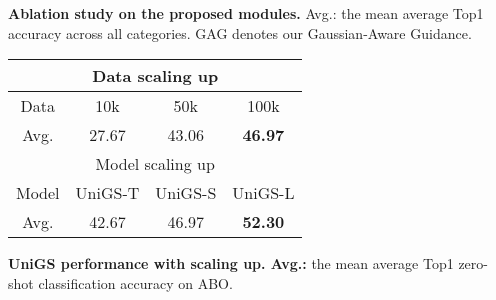 \begin{minipage}{\textwidth}
\begin{minipage}[t]{0.57\textwidth}
\begin{tabularx}{1\textwidth}{ c | c c c c c | c }
\bottomrule
\end{tabularx}
		\caption{\textbf{Ablation study on the proposed modules.} Avg.: the mean average Top1 accuracy across all categories. GAG denotes our Gaussian-Aware Guidance.}
  \label{tab:ablation-study-structure}
\end{minipage}
    \hspace{8pt}
\begin{minipage}[t]{0.37\textwidth}
\makeatletter{}
 \addtolength{\tabcolsep}{-3pt}
 \footnotesize
 \begin{tabularx}{1\textwidth}{ c | c c c}
\toprule
\multicolumn{4}{c}{Data scaling up} \tabularnewline
\midrule
  Data & 10k & 50k & 100k \\
 \midrule
 Avg. & 27.67 & 43.06 & \textbf{46.97} \\
\midrule
\midrule
\multicolumn{4}{c}{Model scaling up} \tabularnewline
\midrule
 Model & UniGS-T & UniGS-S & UniGS-L \\
 \midrule
 Avg. & 42.67 & 46.97 & \textbf{52.30} \\
 
\bottomrule
\end{tabularx}
		\caption{\textbf{UniGS performance with scaling up. Avg.: }the mean average Top1 zero-shot classification accuracy on ABO.}
  \label{tab:ablation-study-data}
\end{minipage}
\end{minipage}
\vspace{4pt}

